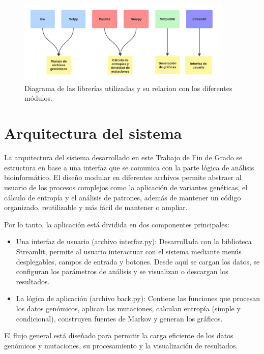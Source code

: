 \documentclass[11pt,spanish,listoffigures,listoftables]{tfgetsinf}
\begin{document}
\begin{figure}[H]
      \centering
      \includegraphics[width=0.9\textwidth]{librerias.png}
      \caption{Diagrama de las librerías utilizadas y su relacion con los diferentes módulos.}
      \label{fig:etiqueta_opcional200}
   \end{figure}


\section{Arquitectura del sistema}

La arquitectura del sistema desarrollado en este Trabajo de Fin de Grado se estructura en base a una interfaz que se comunica con la parte lógica de análisis bioinformático. El diseño modular en diferentes archivos permite abstraer al usuario de los procesos complejos como la aplicación de variantes genéticas, el cálculo de entropía y el análisis de patrones, además de mantener un código organizado, reutilizable y más fácil de mantener o ampliar. 

 

Por lo tanto, la aplicación está dividida en dos componentes principales: 

\begin{itemize}
   \item Una interfaz de usuario (archivo interfaz.py): Desarrollada con la biblioteca Streamlit, permite al usuario interactuar con el sistema mediante menús desplegables, campos de entrada y botones. Desde aquí se cargan los datos, se configuran los parámetros de análisis y se visualizan o descargan los resultados. 
   \item La lógica de aplicación (archivo back.py): Contiene las funciones que procesan los datos genómicos, aplican las mutaciones, calculan entropía (simple y condicional), construyen fuentes de Markov y generan los gráficos. 
\end{itemize}

El flujo general está diseñado para permitir la carga eficiente de los datos genómicos y mutaciones, su procesamiento y la visualización de resultados. 
\end{document}
